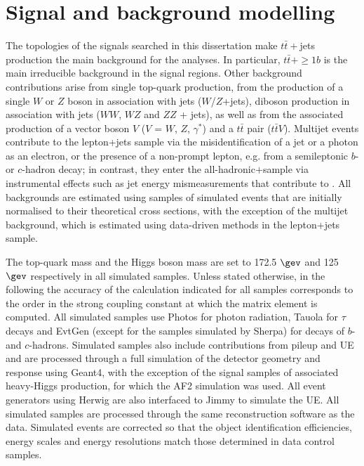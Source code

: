 \section{Signal and background modelling}
\label{chp:sec:sigbkg}

The topologies of the signals searched in this dissertation make $t\bar{t}+$jets production the main background for the analyses. In particular, $t\bar{t}+\ge1 b$ is the main irreducible background in the signal regions. Other background contributions arise from single top-quark production, from the production of a single $W$ or $Z$ boson in association with jets ($W$/$Z$+jets), diboson production in association with jets ($WW$, $WZ$ and $ZZ$ + jets), as well as from the associated production of a vector boson $V$ ($V$ = $W$, $Z$, $\gamma^{*}$) and a $t\bar{t}$ pair ($t\bar{t}V$). Multijet events contribute to the lepton+jets sample via the misidentification of a jet or a photon as an electron, or the presence of a non-prompt lepton, e.g. from a semileptonic $b$- or $c$-hadron decay; in contrast, they enter the all-hadronic$+$\MET sample via instrumental effects such as jet energy mismeasurements that contribute to \MET. All backgrounds are estimated using samples of simulated events that are initially normalised to their theoretical cross sections, with the exception of the multijet background, which is estimated using data-driven methods in the lepton+jets sample.\par
The top-quark mass and the Higgs boson mass are set to 172.5 $\gev$ and 125 $\gev$ respectively in all simulated samples. Unless stated otherwise, in the following the accuracy of the calculation indicated for all samples corresponds to the order in the strong coupling constant at which the matrix element is computed. All simulated samples use {\sc Photos} for photon radiation, {\sc Tauola} for $\tau$ decays and {\sc EvtGen} (except for the samples simulated by {\sc Sherpa}) for decays of $b$- and $c$-hadrons.
Simulated samples also include contributions from pileup and UE and are processed through a full simulation of the detector geometry and response using {\sc Geant4}, with the exception of the signal samples of associated heavy-Higgs production, for which the AF2 simulation was used. All event generators using {\sc Herwig} are also interfaced to {\sc Jimmy} to simulate the UE. All simulated samples are processed through the same reconstruction software as the data. Simulated events are corrected so that the object identification efficiencies, energy scales and energy resolutions match those determined in data control samples. 


